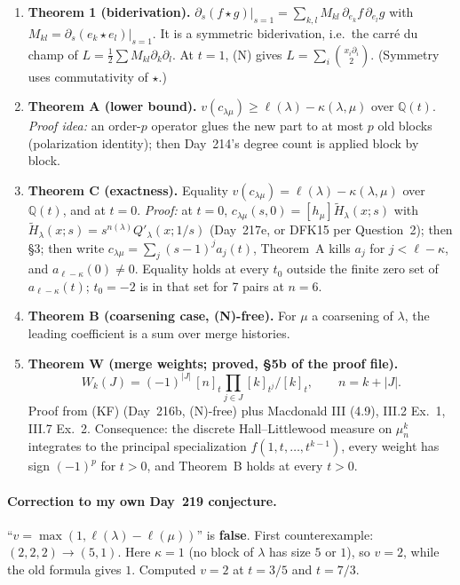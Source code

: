 \documentclass[10pt]{article}
\newcommand{\ka}{\kappa}
\begin{document}
\begin{enumerate}
\item \textbf{Theorem 1 (biderivation).}
$\partial_s(f\star g)|_{s=1}=\sum_{k,l}M_{kl}\,\partial_{e_k}f\,\partial_{e_l}g$ with $M_{kl}=\partial_s(e_k\star e_l)|_{s=1}$.
It is a symmetric biderivation, i.e.\ the carr\'e du champ of $L=\tfrac12\sum M_{kl}\partial_k\partial_l$.
At $t=1$, (N) gives $L=\sum_i\binom{x_i\partial_i}{2}$. (Symmetry uses commutativity of $\star$.)

\item \textbf{Theorem A (lower bound).} $v(c_{\lambda\mu})\ge\ell(\lambda)-\ka(\lambda,\mu)$ over $\mathbb Q(t)$.
\emph{Proof idea:} an order-$p$ operator glues the new part to at most $p$ old blocks (polarization identity); then
Day~214's degree count is applied block by block.

\item \textbf{Theorem C (exactness).} Equality $v(c_{\lambda\mu})=\ell(\lambda)-\ka(\lambda,\mu)$ over $\mathbb Q(t)$, and at $t=0$.
\emph{Proof:} at $t=0$, $c_{\lambda\mu}(s,0)=[h_\mu]\widetilde H_\lambda(x;s)$ with $\widetilde H_\lambda(x;s)=s^{n(\lambda)}Q'_\lambda(x;1/s)$
(Day~217e, or DFK15 per Question~2); then \S3; then write $c_{\lambda\mu}=\sum_j(s-1)^ja_j(t)$, Theorem~A kills $a_j$ for
$j<\ell-\ka$, and $a_{\ell-\ka}(0)\ne0$.
Equality holds at every $t_0$ outside the finite zero set of $a_{\ell-\ka}(t)$; $t_0=-2$ is in that set for 7 pairs at $n=6$.

\item \textbf{Theorem B (coarsening case, (N)-free).} For $\mu$ a coarsening of $\lambda$, the leading coefficient is a sum
over merge histories.

\item \textbf{Theorem W (merge weights; proved, \S5b of the proof file).}
\[
W_k(J)=(-1)^{|J|}\,[n]_t\prod_{j\in J}[k]_{t^j}\big/[k]_t,\qquad n=k+|J|.
\]
Proof from (KF) (Day~216b, (N)-free) plus Macdonald III (4.9), III.2 Ex.~1, III.7 Ex.~2. Consequence: the discrete
Hall--Littlewood measure on $\mu_n^k$ integrates to the principal specialization $f(1,t,\dots,t^{k-1})$, every weight has
sign $(-1)^p$ for $t>0$, and Theorem~B holds at every $t>0$.
\end{enumerate}

\paragraph{Correction to my own Day~219 conjecture.} ``$v=\max(1,\ell(\lambda)-\ell(\mu))$'' is \textbf{false}.
First counterexample: $(2,2,2)\to(5,1)$. Here $\ka=1$ (no block of $\lambda$ has size $5$ or $1$), so $v=2$, while the old
formula gives $1$. Computed $v=2$ at $t=3/5$ and $t=7/3$.
\end{document}
